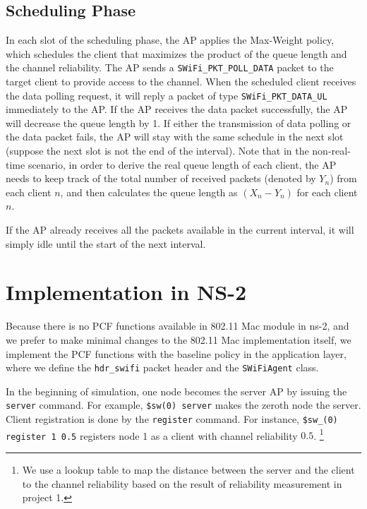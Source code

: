 \documentclass{article}
\begin{document}
\subsection{Scheduling Phase}
In each slot of the scheduling phase, the AP applies the Max-Weight policy, which schedules the client that maximizes the product of the queue length and the channel reliability. The AP sends a \lstinline|SWiFi_PKT_POLL_DATA| packet to the target client to provide access to the channel. When the scheduled client receives the data polling request, it will reply a packet of type \lstinline|SWiFi_PKT_DATA_UL| immediately to the AP. If the AP receives the data packet successfully, the AP will decrease the queue length by 1. If either the transmission of data polling or the data packet fails, the AP will stay with the same schedule in the next slot (suppose the next slot is not the end of the interval). Note that in the non-real-time scenario, in order to derive the real queue length of each client, the AP needs to keep track of the total number of received packets (denoted by $Y_n$) from each client $n$, and then calculates the queue length as $(X_n - Y_n)$ for each client $n$.

If the AP already receives all the packets available in the current interval, it will simply idle until the start of the next interval.

     

\section{Implementation in NS-2}
\label{section: ns2}

Because there is no PCF functions available in 802.11 Mac module in ns-2, and we
prefer to make minimal changes to the 802.11 Mac implementation itself, we
implement the PCF functions with the baseline policy in the application layer,
where we define the \lstinline|hdr_swifi| packet header and the \lstinline|SWiFiAgent| class.

In the beginning of simulation, one node becomes the server AP by issuing the
\lstinline|server| command. For example,
\lstinline|$sw(0) server| makes the zeroth node the server.
Client registration is done by the \lstinline|register|
command. For instance, \lstinline|$sw_(0) register 1 0.5|
registers node 1 as a client with channel reliability $0.5$.%
\footnote{We use a lookup table to map the distance between the server and the
client to the channel reliability based on the result of reliability measurement
in project 1.}
\end{document}
